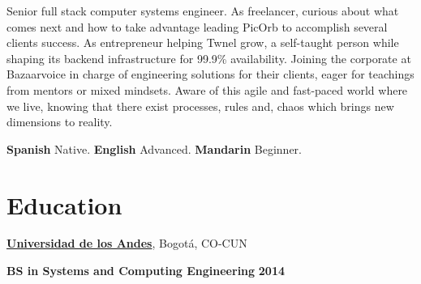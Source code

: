 
Senior full stack computer systems engineer. As freelancer, curious about what
comes next and how to take advantage leading PicOrb to accomplish several clients
success.
As entrepreneur helping Twnel grow, a self-taught person while shaping its
backend infrastructure for 99.9\% availability. Joining the corporate at
Bazaarvoice in charge of engineering
solutions for their clients, eager for teachings from mentors or mixed mindsets.
Aware of this agile and fast-paced world where we live, knowing that there exist
processes, rules and, chaos which brings new dimensions to reality.

\vspace{3.5mm}
\textbf{Spanish} Native. \textbf{English} Advanced. \textbf{Mandarin} Beginner.
%

%

\section{Education}
%
% 
% 
\href{http://www.topuniversities.com/universities/universidad-de-los-andes}{\textbf{Universidad de los Andes}},
Bogot\'{a}, CO-CUN
\begin{outerlist}
\item[\FA \faAngleDoubleRight] \textbf{BS in Systems and Computing Engineering}
\hfill \textbf{2014}
\end{outerlist}

